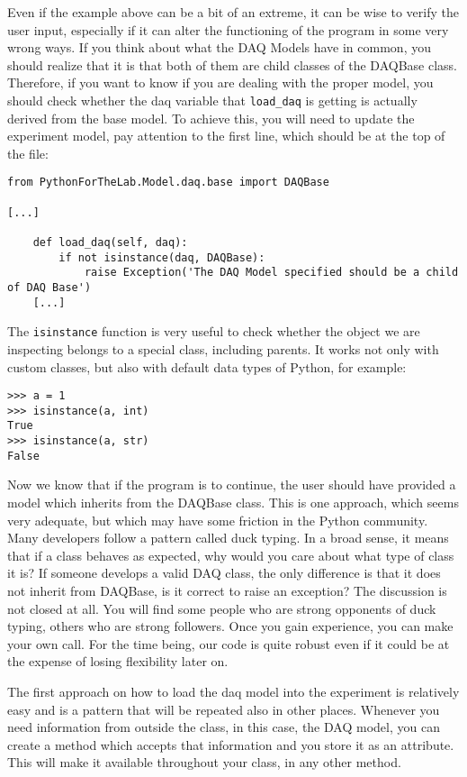 {Even if the example above can be a bit of an extreme, it can be wise to verify the user input, especially if it can alter the functioning of the program in some very wrong ways. If you think about what the {DAQ} Models have in common, you should realize that it is that both of them are child classes of the DAQBase class. Therefore, if you want to know if you are dealing with the proper model, you should check whether the daq variable that \texttt{load_daq} is getting is actually derived from the base model. To achieve this, you will need to update the experiment model, pay attention to the first line, which should be at the top of the file:

\begin{verbatim}
from PythonForTheLab.Model.daq.base import DAQBase

[...]

    def load_daq(self, daq):
        if not isinstance(daq, DAQBase):
            raise Exception('The DAQ Model specified should be a child of DAQ Base')
    [...]
\end{verbatim}

The \texttt{isinstance} function is very useful to check whether the object we are inspecting belongs to a special class, including parents. It works not only with custom classes, but also with default data types of Python, for example:

\begin{verbatim}
>>> a = 1
>>> isinstance(a, int)
True
>>> isinstance(a, str)
False
\end{verbatim}

Now we know that if the program is to continue, the user should have provided a model which inherits from the DAQBase class. This is one approach, which seems very adequate, but which may have some friction in the Python community. Many developers follow a pattern called duck typing. In a broad sense, it means that if a class behaves as expected, why would you care about what type of class it is? If someone develops a valid DAQ class, the only difference is that it does not inherit from DAQBase, is it correct to raise an exception? The discussion is not closed at all. You will find some people who are strong opponents of duck typing, others who are strong followers. Once you gain experience, you can make your own call. For the time being, our code is quite robust even if it could be at the expense of losing flexibility later on. 

The first approach on how to load the daq model into the experiment is relatively easy and is a pattern that will be repeated also in other places. Whenever you need information from outside the class, in this case, the DAQ model, you can create a method which accepts that information and you store it as an attribute. This will make it available throughout your class, in any other method. 

}
